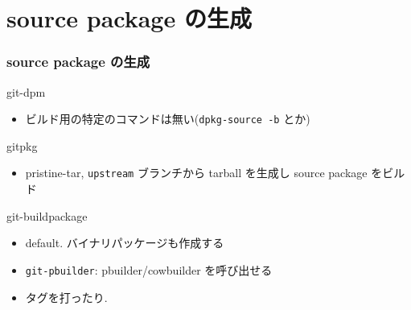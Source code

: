 \documentclass[10pt,final,c,dvipdfmx,cjk,colorlinks=false]{beamer}
\begin{document}
\section{source package の生成}
\label{sec-5}
\begin{frame}
\frametitle{source package の生成}
\label{sec-5-1}
\begin{block}{git-dpm}
\label{sec-5-1-1}

\begin{itemize}
\item ビルド用の特定のコマンドは無い(\texttt{dpkg-source -b} とか)
\end{itemize}
\end{block}
\begin{block}{gitpkg}
\label{sec-5-1-2}

\begin{itemize}
\item pristine-tar, \texttt{upstream} ブランチから tarball を生成し
      source package をビルド
\end{itemize}
\end{block}
\begin{block}{git-buildpackage}
\label{sec-5-1-3}

\begin{itemize}
\item default. バイナリパッケージも作成する
\item \texttt{git-pbuilder}: pbuilder/cowbuilder を呼び出せる
\item タグを打ったり.
\end{itemize}
\end{block}
\end{frame}
\end{document}
